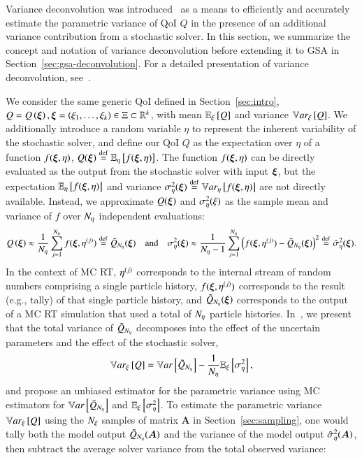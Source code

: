 Variance deconvolution was introduced~\cite{clements-etal-2024, olson-2019} as a means to efficiently and accurately estimate the parametric variance of QoI $Q$ in the presence of an additional variance contribution from a stochastic solver.  
In this section, we summarize the concept and notation of variance deconvolution before extending it to GSA in Section~\ref{sec:gsa-deconvolution}.
For a detailed presentation of variance deconvolution, see~\cite{clements-etal-2024}. 

We consider the same generic QoI defined in Section~\ref{sec:intro}, $Q = Q\left( \bm{\xi} \right), \bm{\xi} = \left( \xi_1,\ldots,\xi_k \right) \in \Xi \subset \mathbb{R}^k$, with mean $\mathbb{E}_\xi\left[Q\right]$ and variance $\mathbb{V}ar_{\xi}\left[Q\right]$.
We additionally introduce a random variable $\eta$ to represent the inherent variability of the stochastic solver, and define our QoI $Q$ as the expectation over $\eta$ of a function $f(\bm{\xi}, \eta)$, $Q(\bm{\xi}) \overset{\operatorname{def}}{=} \mathbb{E}_\eta\left[f(\bm{\xi},\eta)\right]$. 
The function $f(\bm{\xi}, \eta)$ can be directly evaluated as the output from the stochastic solver with input $\bm{\xi}$, but the expectation $\mathbb{E}_\eta\left[f(\bm{\xi},\eta)\right]$ and variance $\sigma^2_\eta (\bm{\xi}) \overset{\operatorname{def}}{=} \mathbb{V}ar_{\eta}\left[f(\bm{\xi},\eta)\right]$ are not directly available.
Instead, we approximate $Q(\bm{\xi})$ and $\sigma^2_\eta(\xi)$ as the sample mean and variance of $f$ over ${N_\eta}$ independent evaluations:
\begin{equation*}
    Q\left(\bm{\xi}\right) \approx \frac{1}{{N_\eta}}\sum_{j=1}^{{N_\eta}} f (\bm{\xi}, \eta^{(j)}) \overset{\operatorname{def}}{=} \tilde{Q}_{{N_\eta}} (\bm{\xi}) \quad \text{and} \quad \sigma^2_\eta(\bm{\xi}) \approx \frac{1}{{N_\eta}-1} \sum_{j=1}^{{N_\eta}} \left( f(\bm{\xi}, \eta^{(j)} ) - \tilde{Q}_{{N_\eta}}(\bm{\xi}) \right)^2 \overset{\operatorname{def}}{=} \hat{\sigma}^2_\eta (\bm{\xi}) .
\end{equation*}
In the context of MC RT, $\eta^{(j)}$ corresponds to the internal stream of random numbers comprising a single particle history, $f(\bm{\xi},\eta^{(j)})$ corresponds to the result (e.g., tally) of that single particle history, and $\tilde{Q}_{{N_\eta}}(\bm{\xi})$ corresponds to the output of a MC RT simulation that used a total of ${N_\eta}$ particle histories.
In~\cite{clements-etal-2024}, we present that the total variance of $\tilde{Q}_{{N_\eta}}$ decomposes into the effect of the uncertain parameters and the effect of the stochastic solver, 
\begin{equation} \label{m2eq:deconv}
    \mathbb{V}ar_{\xi}\left[Q\right] = \mathbb{V}ar\left[\tilde{Q}_{{N_\eta}}\right] - \frac{1}{{N_\eta}}\mathbb{E}_\xi\left[\sigma^2_\eta\right],
\end{equation}
and propose an unbiased estimator for the parametric variance using MC estimators for $\mathbb{V}ar\left[\tilde{Q}_{{N_\eta}}\right]$ and $\mathbb{E}_\xi\left[\sigma^2_\eta\right]$.
To estimate the parametric variance $\mathbb{V}ar_{\xi}\left[Q\right]$ using the ${N_\xi}$ samples of matrix $\bm{A}$ in Section~\ref{sec:sampling}, one would tally both the model output $\tilde{Q}_{{N_\eta}}(\bm{A})$ and the variance of the model output $\hat{\sigma}^2_\eta(\bm{A})$, then subtract the average solver variance from the total observed variance:
